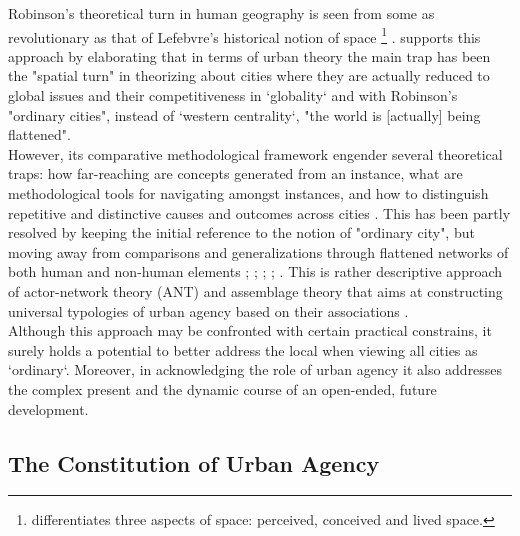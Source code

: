 \documentclass[11pt]{report}
\begin{document}
Robinson's theoretical turn in human geography is seen from some as revolutionary as that of Lefebvre's historical notion of space
\footnote{\href{Lefebvre}{\citealt{lefebvre_production_1974}} differentiates  three aspects of space: perceived, conceived and lived space.}
\href{Chapelin}{\citealt{gintrac_les_2014}}.
\cite{Fraser_Globalization_2006} supports this approach by elaborating that  in  terms  of  urban  theory  the  main  trap  has  been  the "spatial  turn"  in  theorizing  about  cities  where  they  are  actually  reduced  to  global  issues  and  their competitiveness  in  ‘globality‘ and with Robinson's "ordinary cities", instead of ‘western centrality‘, "the world is [actually] being flattened".
\\

However, its comparative methodological framework engender several theoretical traps: how far-reaching are concepts generated from an instance, what are methodological tools for navigating amongst instances, and how to distinguish repetitive and distinctive causes and outcomes across cities \href{Robinson}{\citealt{robinson_comparative_2015}}.
This has been partly resolved by keeping the initial reference to the notion of "ordinary city", but moving away from comparisons and generalizations through flattened networks of both human and non-human elements
 \href{Robinson}{\citealt{Robinson2004}};
\href{Sassen}{\cite{Sassen2008}}; \href{McFarlane}{\cite{McFarlane2010}}; \href{Farias}{\citealt{farias_introduction:_2011}}; \href{Rankin}{\citealt{rankin_assemblage_2011}}.
This is rather descriptive approach of actor-network theory (ANT) and assemblage theory that aims at constructing universal typologies of urban agency based on their associations \href{Scott}{\citealt{scott_nature_2015}}.
\\

Although this approach may  be  confronted  with  certain practical constrains, it surely holds a potential to better address the local when viewing all cities as ‘ordinary‘. Moreover, in acknowledging the role of urban agency it also addresses the complex present and the dynamic course of an open-ended, future development. 

\subsection{The Constitution of Urban Agency}
\end{document}
